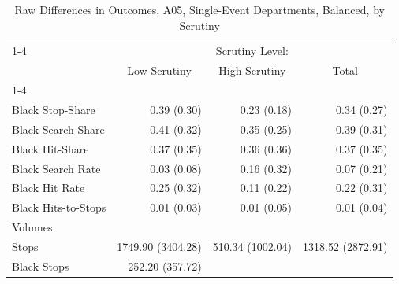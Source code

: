 \begin{table}[!h]
\caption{Raw Differences in Outcomes, A05, Single-Event Departments, Balanced, by Scrutiny}
\centering
\begin{tabular}{llll}
\cline{1-4}
\multicolumn{1}{r}{} &
  \multicolumn{3}{c}{Scrutiny Level:} \\
\multicolumn{1}{r}{} &
  \multicolumn{1}{c}{Low Scrutiny} &
  \multicolumn{1}{c}{High Scrutiny} &
  \multicolumn{1}{c}{Total} \\
\cline{1-4}
\multicolumn{1}{l}{Rates} &
  \multicolumn{1}{r}{} &
  \multicolumn{1}{r}{} &
  \multicolumn{1}{r}{} \\
\multicolumn{1}{l}{\hspace{1em}Black Stop-Share} &
  \multicolumn{1}{r}{0.39 (0.30)} &
  \multicolumn{1}{r}{0.23 (0.18)} &
  \multicolumn{1}{r}{0.34 (0.27)} \\
\multicolumn{1}{l}{\hspace{1em}Black Search-Share} &
  \multicolumn{1}{r}{0.41 (0.32)} &
  \multicolumn{1}{r}{0.35 (0.25)} &
  \multicolumn{1}{r}{0.39 (0.31)} \\
\multicolumn{1}{l}{\hspace{1em}Black Hit-Share} &
  \multicolumn{1}{r}{0.37 (0.35)} &
  \multicolumn{1}{r}{0.36 (0.36)} &
  \multicolumn{1}{r}{0.37 (0.35)} \\
\multicolumn{1}{l}{\hspace{1em}Black Search Rate} &
  \multicolumn{1}{r}{0.03 (0.08)} &
  \multicolumn{1}{r}{0.16 (0.32)} &
  \multicolumn{1}{r}{0.07 (0.21)} \\
\multicolumn{1}{l}{\hspace{1em}Black Hit Rate} &
  \multicolumn{1}{r}{0.25 (0.32)} &
  \multicolumn{1}{r}{0.11 (0.22)} &
  \multicolumn{1}{r}{0.22 (0.31)} \\
\multicolumn{1}{l}{\hspace{1em}Black Hits-to-Stops} &
  \multicolumn{1}{r}{0.01 (0.03)} &
  \multicolumn{1}{r}{0.01 (0.05)} &
  \multicolumn{1}{r}{0.01 (0.04)} \\
\multicolumn{1}{l}{Volumes} &
  \multicolumn{1}{r}{} &
  \multicolumn{1}{r}{} &
  \multicolumn{1}{r}{} \\
\multicolumn{1}{l}{\hspace{1em}Stops} &
  \multicolumn{1}{r}{1749.90 (3404.28)} &
  \multicolumn{1}{r}{510.34 (1002.04)} &
  \multicolumn{1}{r}{1318.52 (2872.91)} \\
\multicolumn{1}{l}{\hspace{1em}Black Stops} &
  \multicolumn{1}{r}{252.20 (357.72)} &

\end{tabular}
\end{table}

